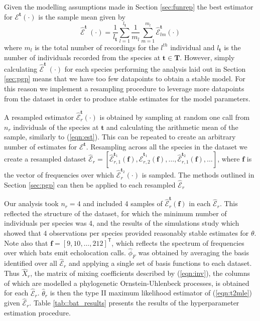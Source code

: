 \documentclass[wsdraft]{ws-rv9x6} %
\begin{document}
Given the modelling assumptions made in Section \ref{sec:funrep} the best estimator for \(\mathcal{E}^{\mathbf{t}}(\cdot)\) is the sample mean given by 
\begin{equation}
\hat{\mathcal{E}}^{\mathbf{t}}~(\cdot) = \frac{1}{l_{\mathbf{t}}} \sum_{l = 1}^{l_{\mathbf{t}}} \frac{1}{m_l} \sum_{m = 1}^{m_l} \hat{\mathcal{E}}_{lm}^{\mathbf{t}}(\cdot)
\label{eqn:est}
\end{equation}
where \(m_l\) is the total number of recordings for the \(l^{th}\) individual and \(l_{\mathbf{t}}\) is the number of individuals recorded from the species at \(\mathbf{t} \in \mathbf{T}\). However, simply calculating \(\hat{\mathcal{E}}^{\mathbf{t}}~(\cdot)\) for each species performing the analysis laid out in Section \ref{sec:pgp} means that we have too few datapoints to obtain a stable model. For this reason we implement a resampling procedure to leverage more datapoints from the dataset in order to produce stable estimates for the model parameters.

A resampled estimator \(\hat{\mathcal{E}}_r^{\mathbf{t}}(\cdot)\) is obtained by sampling at random one call from \(n_r\) individuals of the species at \(\mathbf{t}\) and calculating the arithmetic mean of the sample, similarly to (\ref{eqn:est}). This can be repeated to create an arbitrary number of estimates for \(\mathcal{E}^{\mathbf{t}}\). Resampling across all the species in the dataset we create a resampled dataset \(\hat{\mathcal{E}}_r = [\hat{\mathcal{E}}_{r,1}^{\mathbf{t}_1}(\mathbf
f), \hat{\mathcal{E}}_{r,2}^{\mathbf{t}_1}(\mathbf
f), \dots, \hat{\mathcal{E}}_{r,1}^{\mathbf{t}_2}(\mathbf
f), \dots]\), where \(\mathbf{f}\) is the vector of frequencies over which \(\hat{\mathcal{E}}_{r}^{\mathbf{t}_2}(
\cdot)\) is sampled. The methods outlined in Section \ref{sec:pgp} can then be applied to each resampled \(\hat{\mathcal{E}}_r\)

Our analysis took \(n_r = 4\) and included 4 samples of \(\hat{\mathcal{E}}_r^{\mathbf{t}}(\mathbf{f})\) in each \(\hat{\mathcal{E}}_r\). This reflected the structure of the dataset, for which the minimum number of individuals per species was 4, and the results of the simulations study which showed that 4 observations per species provided reasonably stable estimates for \(\theta\). Note also that \(\mathbf{f} = [9,10, \dots, 212]^{\mathsf{T}}\), which reflects the spectrum of frequencies over which bats emit echolocation calls. \(\hat{\phi}_F\) was obtained by averaging the basis identified over all \(\hat{\mathcal{E}}_r\) and applying a single set of basis functions to each dataset. Thus \(\hat{X}_r\), the matrix of mixing coefficients described by (\ref{eqn:inv}), the columns of which are modelled a phylogenetic Ornstein-Uhlenbeck processes, is obtained for each \(\hat{\mathcal{E}}_r\). \(\hat{\theta}_r\) is then the type II maximum likelihood estimator of (\ref{eqn:t2mle}) given \(\hat{\mathcal{E}}_r\). Table \ref{tab::bat_results} presents the results of the hyperparameter estimation procedure.
\end{document}
